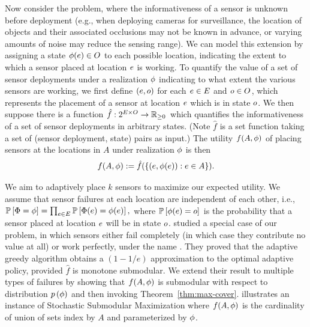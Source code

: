 %
Now consider the problem,
where the informativeness of a sensor is unknown before deployment (e.g., when deploying cameras for surveillance, the location of objects and their associated occlusions may not be known in advance, or varying amounts of noise may reduce the sensing range). We can model this extension
by assigning a state ${\color{black}{\ensuremath{\phi}}}(e)\in O$ to each
possible location, indicating the extent to which a sensor placed at location
$e$ is working.  To quantify the value of a set of sensor deployments
under a realization ${\color{black}{\ensuremath{\phi}}}$ indicating to what extent the various
sensors are working, we first define $(e,{o})$ for each $e \in E$ and $o
\in O$, which represents the placement of a sensor 
at location $e$ which is in state 
$o$.  We then suppose there is a function 
$\hat{f}:2^{E\times O} \to \mathbb{R}_{\ge 0}$ which
quantifies the informativeness of a set of sensor deployments in arbitrary
states.  (Note $\hat{f}$ is a set function taking a set of (sensor
deployment, state) pairs as input.) 
The utility $f(A,{\color{black}{\ensuremath{\phi}}})$ of placing sensors at the locations in $A$
under realization ${\color{black}{\ensuremath{\phi}}}$ is then
$$f(A,{\color{black}{\ensuremath{\phi}}}) := \hat{f}(\left\{(e,{\color{black}{\ensuremath{\phi}}}(e)) : e \in A\right\}).$$ 
 We aim to adaptively place $k$ sensors to maximize our expected utility.
We assume that sensor failures at each location are independent of each other, i.e., 
$\mathbb{P}\left[{\color{black}{\ensuremath{\Phi}}} = {\color{black}{\ensuremath{\phi}}}\right] =\prod_{e \in E}\mathbb{P}\left[{\color{black}{\ensuremath{\Phi}}}(e) = {\color{black}{\ensuremath{\phi}}}(e)\right] ,$
where $\mathbb{P}\left[{\color{black}{\ensuremath{\phi}}}(e)=o\right] $ is the probability that a sensor
placed at location $e$ will be in state $o$. 
\citet{AsadpourNS08} studied 
a special case of our problem,  
in which sensors either fail completely (in which case they
contribute no value at all) or work perfectly,
under the name \emph{\probname}. They proved that the adaptive greedy
algorithm obtains a 
$(1-1/e)$ approximation to the
optimal adaptive policy, provided $\hat{f}$ is monotone submodular.  
%
%
We extend their result to multiple types of failures
by showing that $f(A,{\color{black}{\ensuremath{\phi}}})$ is \term submodular with respect to distribution ${\color{black}{\ensuremath{p \left( {{\color{black}{\ensuremath{\phi}}}} \right) }}}$ and then invoking Theorem~\ref{thm:max-cover}.  illustrates an instance of Stochastic Submodular Maximization where $f(A,{\color{black}{\ensuremath{\phi}}})$ is the cardinality of union of sets index by $A$ and parameterized by ${\color{black}{\ensuremath{\phi}}}$.

